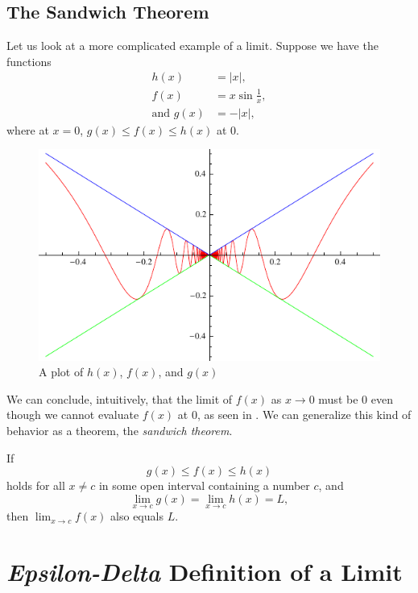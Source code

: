 \subsection{The Sandwich Theorem}
Let us look at a more complicated example of a limit.
Suppose we have the functions
\begin{align*}
  h(x) &= |x|, \\
  f(x) &= x\sin{\frac{1}{x}}, \\
  \text{and }g(x) &= -|x|,
\end{align*}
where at \(x=0\), \(g(x) \leq f(x) \leq h(x)\) at 0.
\begin{figure}[H]
  \begin{center}
    \includegraphics{graphs/sandwichtheorem.pdf}
  \end{center}
  \caption{A plot of \(h(x)\), \(f(x)\), and \(g(x)\)}
\end{figure}
We can conclude, intuitively, that the limit of \(f(x)\) as \(x \to 0\) must be
0 even though we cannot evaluate \(f(x)\) at 0, as seen in
. We can generalize this kind of behavior as a theorem, the
\emph{sandwich theorem}.
\begin{theorem}
  If \[g(x) \leq f(x) \leq h(x)\] holds for all \(x \neq c\) in some open interval containing a number \(c\),
  and
  \[ \lim_{x \to c} g(x) = \lim_{x \to c} h(x) = L, \]
  then \(\lim_{x \to c} f(x)\) also equals $L$.
  \label{th:sandwich}
\end{theorem}

\section{\emph{Epsilon-Delta} Definition of a Limit}

